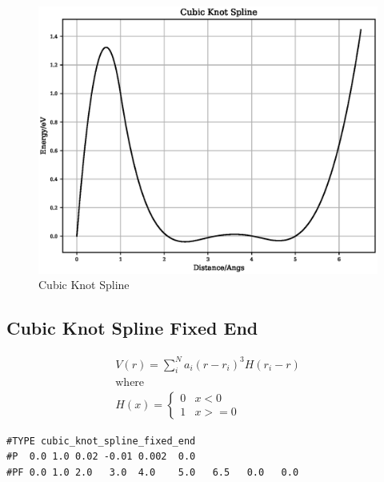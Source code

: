 \FloatBarrier
\begin{figure}[h]
  \begin{center}
    \includegraphics[scale=0.5]{appendix/functions/plots/cubic_knot_spline.eps}
    \caption{Cubic Knot Spline}
    \label{graph:graph1}
  \end{center}
\end{figure}
\FloatBarrier





\subsection{Cubic Knot Spline Fixed End}

\begin{equation}
\begin{split}
V(r) = \sum_i^N a_i (r - r_i)^3 H(r_i - r) \\
\text{where } \\
H(x) = \left\{ \begin{matrix} 0 & x<0 \\  1 & x >= 0 \end{matrix} \right . 
\end{split}
\label{eq:cubicKnotSplineFixedEnd}
\end{equation}


\begin{lstlisting}[style=pseudocode,caption={Cubic Knot Spline Fixed End}]
#TYPE cubic_knot_spline_fixed_end
#P  0.0 1.0 0.02 -0.01 0.002  0.0
#PF 0.0 1.0 2.0   3.0  4.0    5.0   6.5   0.0   0.0
\end{lstlisting}

